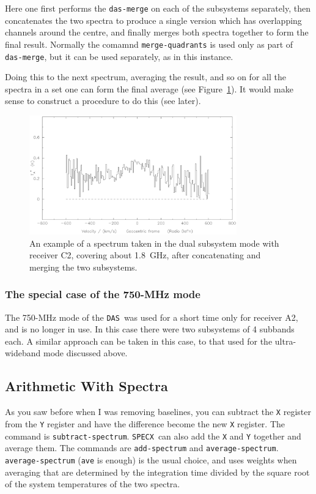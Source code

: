 \documentclass[11pt,twoside]{starlink}
\providecommand{\SPECX}{\texttt{SPECX}}
\providecommand{\das}{\texttt{DAS}}
\begin{document}
Here one first performs the \texttt{das-merge} on each of the subsystems
separately, then concatenates the two spectra to produce a single
version which has overlapping channels around the centre, and finally
merges both spectra together to form the final result. Normally the
comamnd \texttt{merge-quadrants} is used only as part of \texttt{das-merge},
but it can be used separately, as in this instance.

Doing this to the next spectrum, averaging the result, and so on for
all the spectra in a set one can form the final average (see
Figure~\ref{fig:concatenation}). It would make sense to construct a
procedure to do this (see later).

\begin{figure}[htb]
\centering
\includegraphics[width=0.8\textwidth]{sc8_concat}
\caption[Extreme wideband spectra (concatenation)]
{\small{An example of a spectrum taken in the dual subsystem mode with
receiver C2, covering about 1.8~GHz, after concatenating and merging
the two subsystems.
 }}
\label{fig:concatenation}
\end{figure}

\subsubsection{The special case of the 750-MHz mode}
The 750-MHz mode of the \das\ was used for a short time only for
receiver A2, and is no longer in use. In this case there were two
subsystems of 4 subbands each. A similar approach can be taken in this
case, to that used for the ultra-wideband mode discussed above.

\subsection{Arithmetic With Spectra}
\label{sec:specx_8.1}

As you saw before when I was removing baselines, you can subtract the
\texttt{X} register from the \texttt{Y} register and have the difference
become the new \texttt{X} register.  The command is \texttt{subtract-spectrum}.  \SPECX\ can also add the \texttt{X} and \texttt{Y}
together and average them.  The commands are \texttt{add-spectrum} and
\texttt{average-spectrum}.  \texttt{average-spectrum} ({\tt{ave}} is enough)
is the usual choice, and uses weights when averaging that are
determined by the integration time divided by the square root of the
system temperatures of the two spectra.
\end{document}
